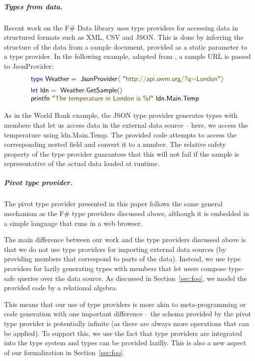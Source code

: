 \documentclass[a4paper,UKenglish]{lipics-v2016}
\theoremstyle{plain}
\theoremstyle{definition}
\newcommand{\langl}{\begin{picture}(4.5,7)
\put(1.1,2.5){\rotatebox{60}{\line(1,0){5.5}}}
\put(1.1,2.5){\rotatebox{300}{\line(1,0){5.5}}}
\end{picture}}
\newcommand{\rangl}{\begin{picture}(4.5,7)
\put(.9,2.5){\rotatebox{120}{\line(1,0){5.5}}}
\put(.9,2.5){\rotatebox{240}{\line(1,0){5.5}}}
\end{picture}}
\newcommand{\str}[1]{\textnormal{\textcolor{strclr}{\sffamily "#1"}}}
\newcommand{\kvd}[1]{\textnormal{\textcolor{kvdclr}{\sffamily #1}}}
\newcommand{\ident}[1]{\textnormal{\sffamily #1}}
\begin{document}
\subparagraph{Types from data.} Recent work on the F\# Data library \cite{fsdata} uses type providers for 
accessing data in structured formats such as XML, CSV and JSON. This is done by inferring the 
structure of the data from a sample document, provided as a static parameter to a type provider.
In the following example, adapted from \cite{fsdata}, a sample URL is passed to \ident{JsonProvider}:
%
\begin{equation*}
\begin{array}{l}
 \kvd{type}~\ident{Weather} = \ident{JsonProvider}\langl\str{http://api.owm.org/?q=London}\rangl \\[0.5em]
 \kvd{let}~\ident{ldn} = \ident{Weather.GetSample}()\\
 \ident{printfn}~\str{The temperature in London is \%f}~\ident{ldn.Main.Temp}
\end{array}
\end{equation*}

\noindent
As in the World Bank example, the JSON type provider generates types with members that let us access
data in the external data source -- here, we access the temperature using \ident{ldn.Main.Temp}. 
The provided code attempts to access the corresponding nested field and convert it to a number.
The relative safety property of the type provider guarantees that this will not fail if the sample 
is representative of the actual data loaded at runtime.
    
\subparagraph{Pivot type provider.} The pivot type provider presented in this paper follows the 
same general mechanism as the F\# type providers discussed above, although it is embedded in a 
simple language that runs in a web browser. 

The main difference between our work and the type providers discussed above is that we do not use
type providers for importing external data sources (by providing members that correspond to parts 
of the data). Instead, we use type providers for lazily generating types with members that let 
users compose type-safe queries over the data source. As discussed in Section~\ref{sec:foo}, we 
model the provided code by a relational algebra.

This means that our use of type providers is more akin to meta-programming or code generation with
one important difference -- the schema provided by the pivot type provider is potentially infinite
(as there are always more operations that can be applied). To support this, we use the fact that
type providers are integrated into the type system and types can be provided lazilly. This is 
also a new aspect of our formalization in Section~\ref{sec:foo}.
\end{document}
